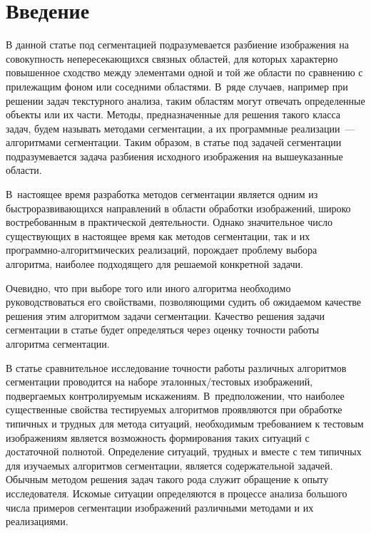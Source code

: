       \begin{multicols}{2}
      
            \label{st\stat}

  
  \section{Введение}
  
  В данной статье под сегментацией подразумевается разбиение изображения 
на совокупность непересекающихся связных областей, для которых характерно 
повышенное сходство между элементами одной и той же области по сравнению 
с прилежащим фоном или соседними областями. В~ряде случаев, например при 
решении задач текстурного анализа, таким областям могут отвечать 
определенные объекты или их части. Методы, предназначенные для решения 
такого класса задач, будем называть методами сегментации, а их программные 
реализации~--- алгоритмами сегментации. Таким образом, в статье под задачей 
сегментации подразумевается задача разбиения исходного изображения на 
вышеуказанные области.
  
  В~настоящее время разработка методов сегментации является одним из 
быстроразвивающихся направлений в области обработки изображений,\linebreak
широко 
востребованным в практической деятель\-ности. Однако значительное число 
существующих в настоящее время как методов сегментации, так и их 
программно-алгоритмических реализаций, порождает проблему выбора 
алгоритма, наиболее подходящего для решаемой конкретной задачи.
  
  Очевидно, что при выборе того или иного алгоритма необходимо 
руководствоваться его свойствами, позволяющими судить об ожидаемом 
качестве решения этим алгоритмом задачи сегментации. Качество решения 
задачи сегментации в статье будет определяться через оценку точности работы 
алгоритма сегментации.
  
  В статье сравнительное исследование точности работы различных 
алгоритмов сегментации проводится на наборе эта\-лон\-ных/тес\-то\-вых 
изображений, подвергаемых контролируемым искажениям. В~предположении, 
что наиболее существенные свойства тестируемых алгоритмов проявляются 
при обработке типичных и трудных для метода ситуаций, необходимым 
требованием к тестовым изоб\-ра\-же\-ни\-ям является возможность формирования\linebreak 
таких ситуаций с достаточной полнотой. Определение ситуаций, трудных и 
вместе с тем типичных для изучаемых алгоритмов сегментации, является 
содержательной задачей. Обычным методом решения задач такого рода служит 
обращение к опыту исследователя. Искомые ситуации определяются в процессе 
анализа большого числа примеров сегментации изображений различными 
методами и их реализациями. 


\end{multicols}

